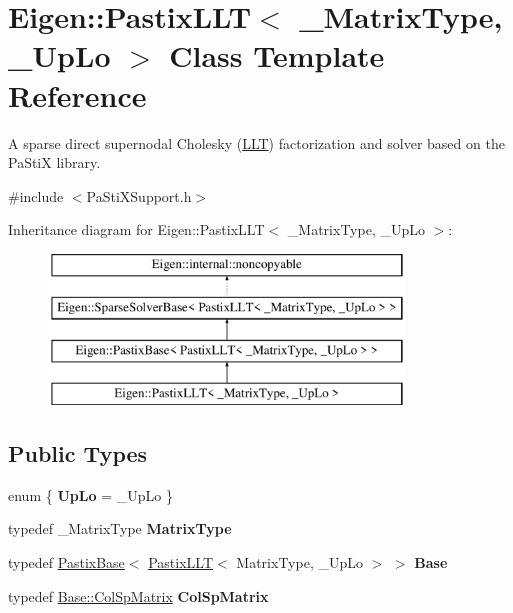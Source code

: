 \hypertarget{class_eigen_1_1_pastix_l_l_t}{}\section{Eigen\+::Pastix\+L\+LT$<$ \+\_\+\+Matrix\+Type, \+\_\+\+Up\+Lo $>$ Class Template Reference}
\label{class_eigen_1_1_pastix_l_l_t}


A sparse direct supernodal Cholesky (\mbox{\hyperlink{class_eigen_1_1_l_l_t}{L\+LT}}) factorization and solver based on the Pa\+StiX library.  




{\ttfamily \#include $<$Pa\+Sti\+X\+Support.\+h$>$}

Inheritance diagram for Eigen\+::Pastix\+L\+LT$<$ \+\_\+\+Matrix\+Type, \+\_\+\+Up\+Lo $>$\+:\begin{figure}[H]
\begin{center}
\leavevmode
\includegraphics[height=4.000000cm]{class_eigen_1_1_pastix_l_l_t}
\end{center}
\end{figure}
\subsection*{Public Types}
\begin{DoxyCompactItemize}
\item 
\mbox{\label{class_eigen_1_1_pastix_l_l_t_a70f658df09aa99397ae983a7dca02256}} 
enum \{ {\bfseries Up\+Lo} = \+\_\+\+Up\+Lo
 \}
\item 
\mbox{\label{class_eigen_1_1_pastix_l_l_t_a94474b44621be2dec32960c129b4f780}} 
typedef \+\_\+\+Matrix\+Type {\bfseries Matrix\+Type}
\item 
\mbox{\label{class_eigen_1_1_pastix_l_l_t_af2b56fad4abb8acff2a0b649a80b5196}} 
typedef \mbox{\hyperlink{class_eigen_1_1_pastix_base}{Pastix\+Base}}$<$ \mbox{\hyperlink{class_eigen_1_1_pastix_l_l_t}{Pastix\+L\+LT}}$<$ Matrix\+Type, \+\_\+\+Up\+Lo $>$ $>$ {\bfseries Base}
\item 
\mbox{\label{class_eigen_1_1_pastix_l_l_t_adbf55149cb1588906b91e5e162573449}} 
typedef \mbox{\hyperlink{class_eigen_1_1_sparse_matrix}{Base\+::\+Col\+Sp\+Matrix}} {\bfseries Col\+Sp\+Matrix}
\end{DoxyCompactItemize}
